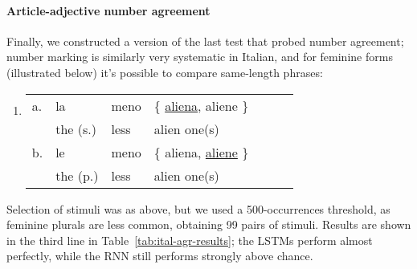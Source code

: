 \paragraph{Article-adjective number agreement}
Finally, we constructed a version of the last test that probed number agreement; number marking is similarly very systematic in Italian, and for feminine forms (illustrated below) it's possible to compare same-length phrases:
\begin{enumerate}[label={(\arabic*)}]
	\item 
\begin{tabular}[t]{lllllll}
	a. & la & meno & \{ \underline{aliena}, aliene \} \\
   &  the (s.)& less & alien one(s)  \\
	b. & le & meno & \{ aliena, \underline{aliene} \} \\
    &the (p.)& less & alien one(s) \\
\end{tabular}
\end{enumerate}
Selection of stimuli was as above, but we used a 500-occurrences
threshold, as feminine plurals are less common, obtaining 99 pairs of stimuli. %
Results are shown in the third line in Table~\ref{tab:ital-agr-results}; the LSTMs perform almost perfectly, while the RNN still performs strongly above chance.

